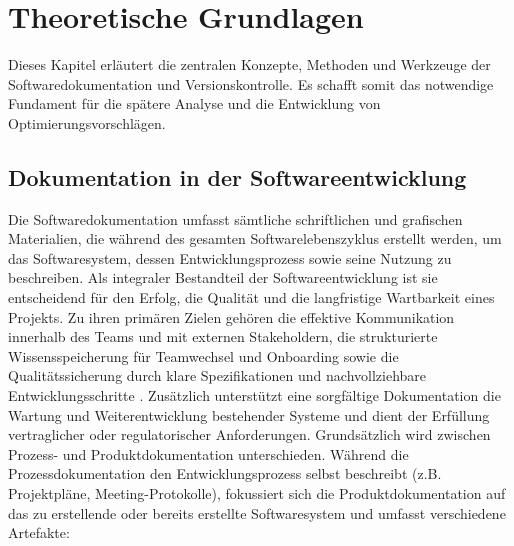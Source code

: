 \documentclass[12pt,oneside]{article}
\begin{document}


    \section{Theoretische Grundlagen}
    \label{sec:grundlagen}
    Dieses Kapitel erläutert die zentralen Konzepte, Methoden und Werkzeuge der Softwaredokumentation und Versionskontrolle. Es schafft somit das notwendige Fundament für die spätere Analyse und die Entwicklung von Optimierungsvorschlägen.

    \subsection{Dokumentation in der Softwareentwicklung}
    \label{subsec:dokumentation}
    Die Softwaredokumentation umfasst sämtliche schriftlichen und grafischen Materialien, die während des gesamten Softwarelebenszyklus erstellt werden, um das Softwaresystem, dessen Entwicklungsprozess sowie seine Nutzung zu beschreiben. Als integraler Bestandteil der Softwareentwicklung ist sie entscheidend für den Erfolg, die Qualität und die langfristige Wartbarkeit eines Projekts. Zu ihren primären Zielen gehören die effektive Kommunikation innerhalb des Teams und mit externen Stakeholdern, die strukturierte Wissensspeicherung für Teamwechsel und Onboarding sowie die Qualitätssicherung durch klare Spezifikationen und nachvollziehbare Entwicklungsschritte \cite{webmakers2024}. Zusätzlich unterstützt eine sorgfältige Dokumentation die Wartung und Weiterentwicklung bestehender Systeme und dient der Erfüllung vertraglicher oder regulatorischer Anforderungen.
    \newline
    Grundsätzlich wird zwischen Prozess- und Produktdokumentation unterschieden. Während die Prozessdokumentation den Entwicklungsprozess selbst beschreibt (z.B. Projektpläne, Meeting-Protokolle), fokussiert sich die Produktdokumentation auf das zu erstellende oder bereits erstellte Softwaresystem und umfasst verschiedene Artefakte:
\end{document}
